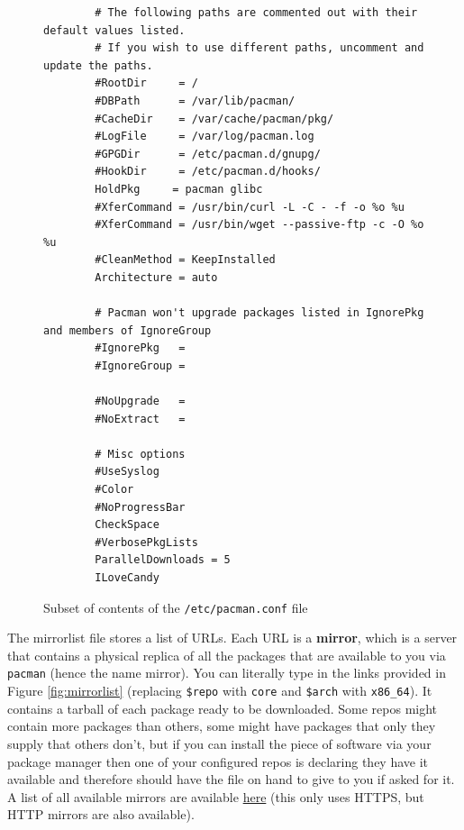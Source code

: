 \documentclass{article}
\begin{document}
    \begin{figure}
      \begin{lstlisting} 
        # The following paths are commented out with their default values listed.
        # If you wish to use different paths, uncomment and update the paths.
        #RootDir     = /
        #DBPath      = /var/lib/pacman/
        #CacheDir    = /var/cache/pacman/pkg/
        #LogFile     = /var/log/pacman.log
        #GPGDir      = /etc/pacman.d/gnupg/
        #HookDir     = /etc/pacman.d/hooks/
        HoldPkg     = pacman glibc
        #XferCommand = /usr/bin/curl -L -C - -f -o %o %u
        #XferCommand = /usr/bin/wget --passive-ftp -c -O %o %u
        #CleanMethod = KeepInstalled
        Architecture = auto

        # Pacman won't upgrade packages listed in IgnorePkg and members of IgnoreGroup
        #IgnorePkg   =
        #IgnoreGroup =

        #NoUpgrade   =
        #NoExtract   =

        # Misc options
        #UseSyslog
        #Color
        #NoProgressBar
        CheckSpace
        #VerbosePkgLists
        ParallelDownloads = 5
        ILoveCandy

      \end{lstlisting}
      \caption{Subset of contents of the \texttt{/etc/pacman.conf} file} \label{fig:pacman.conf}
    \end{figure}
    
    The mirrorlist file stores a list of URLs. Each URL is a \textbf{mirror}, which is a server that contains a physical replica of all the packages that are available to you via \texttt{pacman} (hence the name mirror). You can literally type in the links provided in Figure \ref{fig:mirrorlist} (replacing \texttt{\$repo} with \texttt{core} and \texttt{\$arch} with \texttt{x86\_64}). It contains a tarball of each package ready to be downloaded. Some repos might contain more packages than others, some might have packages that only they supply that others don’t, but if you can install the piece of software via your package manager then one of your configured repos is declaring they have it available and therefore should have the file on hand to give to you if asked for it. A list of all available mirrors are available \href{https://archlinux.org/mirrorlist/all/https/}{here} (this only uses HTTPS, but HTTP mirrors are also available).  
\end{document}
